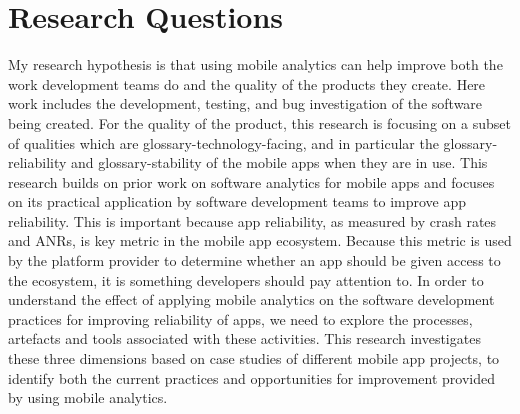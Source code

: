 \section{Research Questions}
\label{section-research-questions}



My research hypothesis is that using mobile analytics can help improve both the work development teams do and the quality of the products they create. Here work includes the development, testing, and bug investigation of the software being created. For the quality of the product, this research is focusing on a subset of qualities which are \gls{glossary-technology-facing}, %
and in particular the \gls{glossary-reliability} and \gls{glossary-stability} of the mobile apps when they are in use. This research builds on prior work on software analytics for mobile apps and focuses on its practical application by software development teams to improve app reliability. This is important because app reliability, as measured by crash rates and ANRs, is key metric in the mobile app ecosystem. Because this metric is used by the platform provider to determine whether an app should be given access to the ecosystem, it is something developers should pay attention to. In order to understand the effect of applying mobile analytics on the software development practices for improving reliability of apps, we need to explore the processes, artefacts and tools associated with these activities. This research investigates these three dimensions based on case studies of different mobile app projects, to identify both the current practices and opportunities for improvement provided by using mobile analytics.


